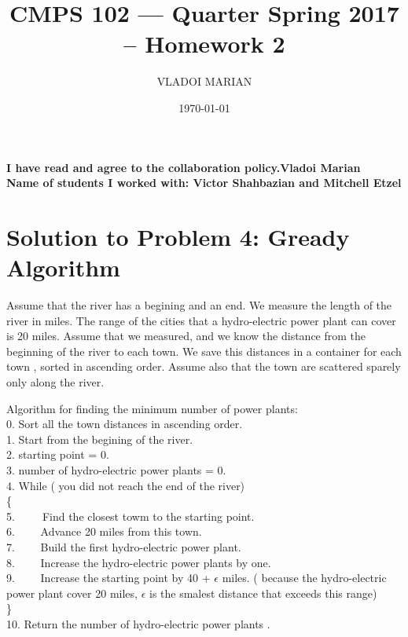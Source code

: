 \documentclass[11 pt]{article}
\title{ CMPS 102 --- Quarter  Spring 2017 --  Homework 2}
\author{VLADOI MARIAN}
\date{\today}
\begin{document}
\maketitle



\begin{center}
{\bf I have read and agree to the collaboration policy.Vladoi Marian}\\
{\bf Name of students I worked with: Victor Shahbazian and Mitchell Etzel }
\end{center}


\section*{Solution to Problem 4: Gready Algorithm}
 Assume that the river has a begining and an end. We measure the length of the river in miles. The range of the cities that a hydro-electric power plant can cover is 20 miles. Assume that we measured, and we know the distance from the beginning of the river to each town. We save this distances in a container for each town , sorted in ascending order. Assume also that the town are scattered sparely only along the river.
 
Algorithm for finding the minimum number of power plants:\\

0. Sort all the town distances in ascending order.\\
1. Start from the begining of the river.\\
2. starting point = 0.\\
3. number of hydro-electric power plants = 0. \\
4. While ( you did not reach the end of the river)\\   \{ \\ 
5.\ \ \ \ \  Find the closest towm to the starting point.\\
6. \ \ \ \   Advance 20 miles from this town.\\
7. \ \ \ \   Build the first hydro-electric power plant.\\
8. \ \ \ \   Increase the hydro-electric power plants by one.\\
9.  \ \ \ \   Increase the starting point by 40 + $\epsilon$  miles. ( because the hydro-electric power plant cover 20 miles, $\epsilon$  is the smalest distance that exceeds this range)\\
\}\\
10. Return the number of hydro-electric power plants .\\
\end{document}
